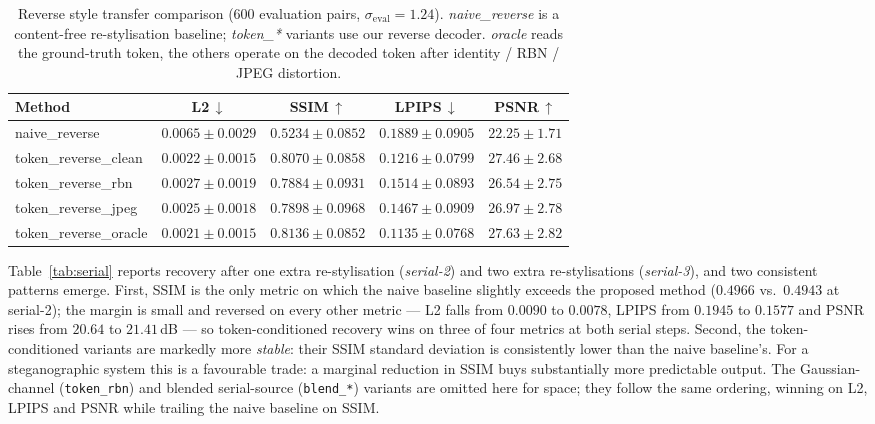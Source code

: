 \documentclass[conference]{IEEEtran}
\begin{document}
\begin{table}[htbp]
\centering
\scriptsize
\caption{Reverse style transfer comparison ($600$ evaluation pairs, $\sigma_{\text{eval}}\!=\!1.24$). \textit{naive\_reverse} is a content-free re-stylisation baseline; \textit{token\_*} variants use our reverse decoder. \textit{oracle} reads the ground-truth token, the others operate on the decoded token after identity / RBN / JPEG distortion.}
\label{tab:reverse}
\setlength{\tabcolsep}{3pt}
\begin{tabular}{lcccc}
\toprule
\textbf{Method} & \textbf{L2}\,$\downarrow$ & \textbf{SSIM}\,$\uparrow$ & \textbf{LPIPS}\,$\downarrow$ & \textbf{PSNR}\,$\uparrow$ \\
\midrule
naive\_reverse        & $0.0065\pm0.0029$ & $0.5234\pm0.0852$ & $0.1889\pm0.0905$ & $22.25\pm1.71$ \\
token\_reverse\_clean & $0.0022\pm0.0015$ & $0.8070\pm0.0858$ & $0.1216\pm0.0799$ & $27.46\pm2.68$ \\
token\_reverse\_rbn   & $0.0027\pm0.0019$ & $0.7884\pm0.0931$ & $0.1514\pm0.0893$ & $26.54\pm2.75$ \\
token\_reverse\_jpeg  & $0.0025\pm0.0018$ & $0.7898\pm0.0968$ & $0.1467\pm0.0909$ & $26.97\pm2.78$ \\
token\_reverse\_oracle & $0.0021\pm0.0015$ & $0.8136\pm0.0852$ & $0.1135\pm0.0768$ & $27.63\pm2.82$ \\
\bottomrule
\end{tabular}
\end{table}

Table~\ref{tab:serial} reports recovery after one extra re-stylisation (\emph{serial-2}) and two extra re-stylisations (\emph{serial-3}), and two consistent patterns emerge. First, SSIM is the only metric on which the naive baseline slightly exceeds the proposed method ($0.4966$ vs.\ $0.4943$ at serial-2); the margin is small and reversed on every other metric --- L2 falls from $0.0090$ to $0.0078$, LPIPS from $0.1945$ to $0.1577$ and PSNR rises from $20.64$ to $21.41$\,dB --- so token-conditioned recovery wins on three of four metrics at both serial steps. Second, the token-conditioned variants are markedly more \emph{stable}: their SSIM standard deviation is consistently lower than the naive baseline's. For a steganographic system this is a favourable trade: a marginal reduction in SSIM buys substantially more predictable output. The Gaussian-channel (\texttt{token\_rbn}) and blended serial-source (\texttt{blend\_*}) variants are omitted here for space; they follow the same ordering, winning on L2, LPIPS and PSNR while trailing the naive baseline on SSIM.
\end{document}
